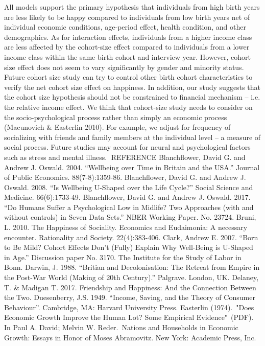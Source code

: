 All models support the primary hypothesis that individuals from high birth years are less likely to be happy compared to individuals from low birth years net of individual economic conditions, age-period effect, health condition, and other demographics. As for interaction effects, individuals from a higher income class are less affected by the cohort-size effect compared to individuals from a lower income class within the same birth cohort and interview year. However, cohort size effect does not seem to vary significantly by gender and minority status. Future cohort size study can try to control other birth cohort characteristics to verify the net cohort size effect on happiness. In addition, our study suggests that the cohort size hypothesis should not be constrained to financial mechanism – i.e. the relative income effect. We think that cohort-size study needs to consider on the socio-psychological process rather than simply an economic process (Macunovich & Easterlin 2010). For example, we adjust for frequency of socializing with friends and family members at the individual level – a measure of social process. Future studies may account for neural and psychological factors such as stress and mental illness. REFERENCE
Blanchflower, David G. and Andrew J. Oswald. 2004. “Wellbeing over Time in Britain and the USA.” Journal of Public Economics. 88(7-8):1359-86.
Blanchflower, David G. and Andrew J. Oswald. 2008. “Is Wellbeing U-Shaped over the Life Cycle?” Social Science and Medicine. 66(6):1733-49.
Blanchflower, David G. and Andrew J. Oswald. 2017. “Do Humans Suffer a Psychological Low in Midlife? Two Approaches (with and without controls) in Seven Data Sets.” NBER Working Paper. No. 23724.
Bruni, L. 2010. The Happiness of Sociality. Economics and Eudaimonia: A necessary encounter. Rationality and Society. 22(4):383-406.
Clark, Andrew E. 2007. “Born to Be Mild? Cohort Effects Don’t (Fully) Explain Why Well-Being is U-Shaped in Age.” Discussion paper No. 3170. The Institute for the Study of Labor in Bonn.
Darwin, J. 1988. “Britian and Decolonisation: The Retreat from Empire in the Post-War World (Making of 20th Century).” Palgrave. London, UK.
Delaney, T. & Madigan T. 2017. Friendship and Happiness: And the Connection Between the Two.
Duesenberry, J.S. 1949. “Income, Saving, and the Theory of Consumer Behaviour”. Cambridge, MA: Harvard University Press.
Easterlin (1974). "Does Economic Growth Improve the Human Lot? Some Empirical Evidence" (PDF). In Paul A. David; Melvin W. Reder. Nations and Households in Economic Growth: Essays in Honor of Moses Abramovitz. New York: Academic Press, Inc.
